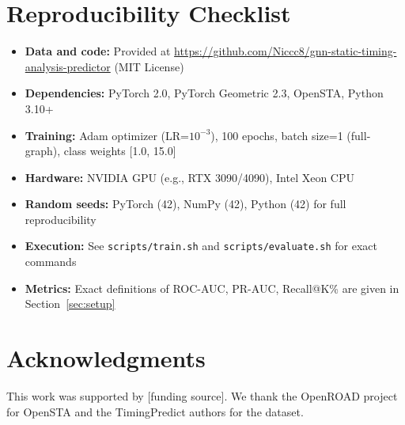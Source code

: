 \documentclass[10pt,twocolumn,journal]{IEEEtran}
\begin{document}
\section*{Reproducibility Checklist}
\begin{itemize}
  \item \textbf{Data and code:} Provided at \url{https://github.com/Niccc8/gnn-static-timing-analysis-predictor} (MIT License)
  \item \textbf{Dependencies:} PyTorch 2.0, PyTorch Geometric 2.3, OpenSTA, Python 3.10+
  \item \textbf{Training:} Adam optimizer (LR=$10^{-3}$), 100 epochs, batch size=1 (full-graph), class weights [1.0, 15.0]
  \item \textbf{Hardware:} NVIDIA GPU (e.g., RTX 3090/4090), Intel Xeon CPU
  \item \textbf{Random seeds:} PyTorch (42), NumPy (42), Python (42) for full reproducibility
  \item \textbf{Execution:} See \texttt{scripts/train.sh} and \texttt{scripts/evaluate.sh} for exact commands
  \item \textbf{Metrics:} Exact definitions of ROC-AUC, PR-AUC, Recall@K\% are given in Section~\ref{sec:setup}
\end{itemize}


\section*{Acknowledgments}
This work was supported by [funding source]. We thank the OpenROAD project for OpenSTA and the TimingPredict authors for the dataset.



\end{document}

